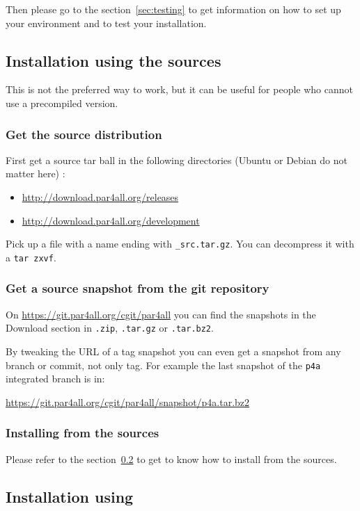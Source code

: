 \documentclass[a4paper]{article}
\begin{document}
Then please go to the section~\ref{sec:testing} to get information on how
to set up your environment and to test your installation.


\subsection{Installation using the sources}

This is not the preferred way to work, but it can be useful for people who
cannot use a precompiled version.


\subsubsection{Get the source distribution}
First get a source tar ball in the following directories (Ubuntu or Debian
do not matter here) :
\begin{itemize}
\item \protect\url{http://download.par4all.org/releases}
\item \protect\url{http://download.par4all.org/development}
\end{itemize}

Pick up a file with a name ending with \texttt{\_src.tar.gz}. You can
decompress it with a \texttt{tar zxvf}.


\subsubsection{Get a source snapshot from the git repository}

On \url{https://git.par4all.org/cgit/par4all} you can find the
snapshots in the Download section in \texttt{.zip}, \texttt{.tar.gz} or
\texttt{.tar.bz2}.

By tweaking the URL of a tag snapshot you can even get a snapshot from any
branch or commit, not only tag. For example the last snapshot of the
\texttt{p4a} integrated branch is in:

\url{https://git.par4all.org/cgit/par4all/snapshot/p4a.tar.bz2}


\subsubsection{Installing from the sources}
Please refer to the section~\ref{sec:installation_using git} to get to
know how to install \Apfa from the sources.


\subsection{Installation using \protect\Agit}
\label{sec:installation_using git}
\end{document}
